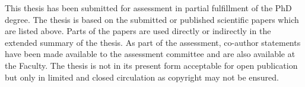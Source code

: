 \noindent This thesis has been submitted for assessment in partial fulfillment of the PhD degree. The thesis is based on the submitted or published scientific papers which are listed above. Parts of the papers are used directly or indirectly in the extended summary of the thesis. As part of the assessment, co-author statements have been made available to the assessment committee and are also available at the Faculty. The thesis is not in its present form acceptable for open publication but only in limited and closed circulation as copyright may not be ensured.